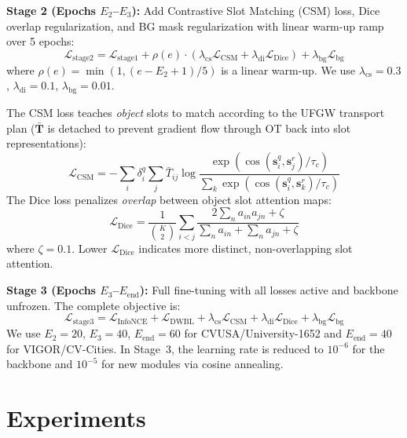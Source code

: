 \documentclass{article}
\newcommand{\cL}{\mathcal{L}}
\begin{document}
\textbf{Stage 2 (Epochs $E_2$--$E_3$):} Add Contrastive Slot Matching (CSM) loss, Dice overlap regularization, and BG mask regularization with linear warm-up ramp over 5 epochs:
\begin{equation}
    \cL_{\text{stage2}} = \cL_{\text{stage1}} + \rho(e) \cdot \left(\lambda_{\text{cs}} \cL_{\text{CSM}} + \lambda_{\text{di}} \cL_{\text{Dice}}\right) + \lambda_{\text{bg}} \cL_{\text{bg}}
\end{equation}
where $\rho(e) = \min(1, (e - E_2 + 1) / 5)$ is a linear warm-up. We use $\lambda_{\text{cs}} = 0.3$, $\lambda_{\text{di}} = 0.1$, $\lambda_{\text{bg}} = 0.01$.

The CSM loss teaches \textit{object} slots to match according to the UFGW transport plan ($\bar{\mathbf{T}}$ is detached to prevent gradient flow through OT back into slot representations):
\begin{equation}
    \cL_{\text{CSM}} = -\sum_i \delta_i^q \sum_j \bar{T}_{ij} \log \frac{\exp(\cos(\mathbf{s}_i^q, \mathbf{s}_j^r)/\tau_c)}{\sum_k \exp(\cos(\mathbf{s}_i^q, \mathbf{s}_k^r)/\tau_c)}
\end{equation}
The Dice loss penalizes \textit{overlap} between object slot attention maps:
\begin{equation}
    \cL_{\text{Dice}} = \frac{1}{\binom{K}{2}} \sum_{i<j} \frac{2 \sum_n a_{in} a_{jn} + \zeta}{\sum_n a_{in} + \sum_n a_{jn} + \zeta}
\end{equation}
where $\zeta = 0.1$. Lower $\cL_{\text{Dice}}$ indicates more distinct, non-overlapping slot attention.

\textbf{Stage 3 (Epochs $E_3$--$E_{\text{end}}$):} Full fine-tuning with all losses active and backbone unfrozen. The complete objective is:
\begin{equation}
    \cL_{\text{stage3}} = \cL_{\text{InfoNCE}} + \cL_{\text{DWBL}} + \lambda_{\text{cs}} \cL_{\text{CSM}} + \lambda_{\text{di}} \cL_{\text{Dice}} + \lambda_{\text{bg}} \cL_{\text{bg}}
\end{equation}
We use $E_2 = 20$, $E_3 = 40$, $E_{\text{end}} = 60$ for CVUSA/University-1652 and $E_{\text{end}} = 40$ for VIGOR/CV-Cities. In Stage~3, the learning rate is reduced to $10^{-6}$ for the backbone and $10^{-5}$ for new modules via cosine annealing.

\section{Experiments}\label{sec:experiments}
\end{document}
